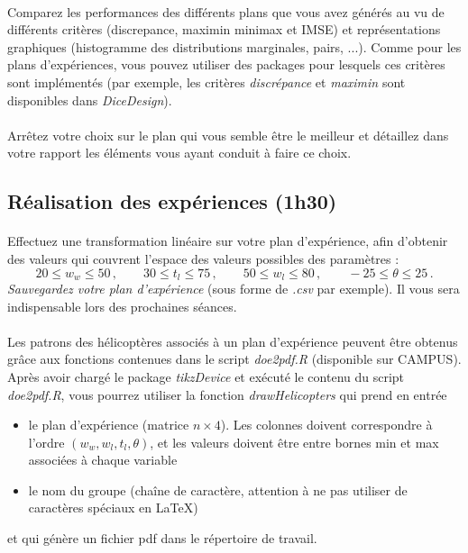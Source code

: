 \documentclass[a4paper,10pt]{article}
\begin{document}
\paragraph{}
Comparez les performances des différents plans que vous avez générés au vu de différents critères (discrepance, maximin minimax et IMSE) et représentations graphiques (histogramme des distributions marginales, pairs, ...). Comme pour les plans d'expériences, vous pouvez utiliser des packages pour lesquels ces critères sont implémentés (par exemple, les critères \emph{discrépance} et \emph{maximin} sont disponibles dans \emph{DiceDesign}).

\paragraph{}
Arrêtez votre choix sur le plan qui vous semble être le meilleur et détaillez dans votre rapport les éléments vous ayant conduit à faire ce choix.

\subsection*{Réalisation des expériences (1h30)}
\paragraph{}
Effectuez une transformation linéaire sur votre plan d'expérience, afin d'obtenir des valeurs qui couvrent l'espace des valeurs possibles des paramètres : 
\begin{equation*}
20  \leq w_w \leq 50 \, , \qquad 30 \leq t_l \leq 75 \, , \qquad 50   \leq w_l \leq 80 \, , \qquad -25  \leq \theta \leq 25 \, .
\end{equation*}
\emph{Sauvegardez votre plan d'expérience} (sous forme de \emph{.csv} par exemple). Il vous sera indispensable lors des prochaines séances.

\paragraph{}
Les patrons des hélicoptères associés à un plan d'expérience peuvent être obtenus grâce aux fonctions contenues dans le script \emph{doe2pdf.R} (disponible sur CAMPUS). Après avoir chargé le package \emph{tikzDevice} et exécuté le contenu du script \emph{doe2pdf.R}, vous pourrez utiliser la fonction \emph{drawHelicopters} qui prend en entrée 
\begin{itemize}
	\item le plan d'expérience (matrice $n \times 4$). Les colonnes doivent correspondre à l'ordre $(w_w,w_l,t_l,\theta)$, et les valeurs doivent être entre bornes min et max associées à chaque variable
	\item le nom du groupe (chaîne de caractère, attention à ne pas utiliser de caractères spéciaux en LaTeX)
\end{itemize}
et qui génère un fichier pdf dans le répertoire de travail.
\end{document}

